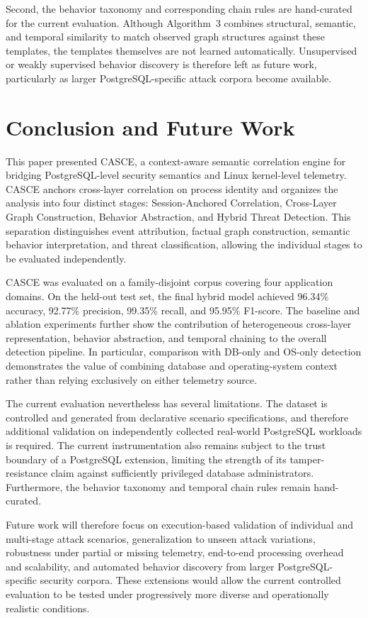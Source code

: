 \documentclass[conference]{IEEEtran}
\begin{document}
Second, the behavior taxonomy and corresponding chain rules are
hand-curated for the current evaluation. Although Algorithm~3 combines
structural, semantic, and temporal similarity to match observed graph
structures against these templates, the templates themselves are not
learned automatically. Unsupervised or weakly supervised behavior
discovery is therefore left as future work, particularly as larger
PostgreSQL-specific attack corpora become available.

\section{Conclusion and Future Work}

This paper presented CASCE, a context-aware semantic correlation engine
for bridging PostgreSQL-level security semantics and Linux kernel-level
telemetry. CASCE anchors cross-layer correlation on process identity and
organizes the analysis into four distinct stages: Session-Anchored
Correlation, Cross-Layer Graph Construction, Behavior Abstraction, and
Hybrid Threat Detection. This separation distinguishes event attribution,
factual graph construction, semantic behavior interpretation, and threat
classification, allowing the individual stages to be evaluated
independently.

CASCE was evaluated on a family-disjoint corpus covering four application domains. 
On the held-out test set, the final hybrid model achieved 96.34\% accuracy, 92.77\% precision,
99.35\% recall, and 95.95\% F1-score. The baseline and ablation
experiments further show the contribution of heterogeneous cross-layer
representation, behavior abstraction, and temporal chaining to the
overall detection pipeline. In particular, comparison with DB-only and
OS-only detection demonstrates the value of combining database and
operating-system context rather than relying exclusively on either
telemetry source.

The current evaluation nevertheless has several limitations. The
dataset is controlled and generated from declarative scenario
specifications, and therefore additional validation on independently
collected real-world PostgreSQL workloads is required. The current
instrumentation also remains subject to the trust boundary of a
PostgreSQL extension, limiting the strength of its tamper-resistance
claim against sufficiently privileged database administrators.
Furthermore, the behavior taxonomy and temporal chain rules remain
hand-curated.

Future work will therefore focus on execution-based validation of
individual and multi-stage attack scenarios, generalization to unseen
attack variations, robustness under partial or missing telemetry,
end-to-end processing overhead and scalability, and automated behavior
discovery from larger PostgreSQL-specific security corpora. These
extensions would allow the current controlled evaluation to be tested
under progressively more diverse and operationally realistic conditions.
\end{document}
